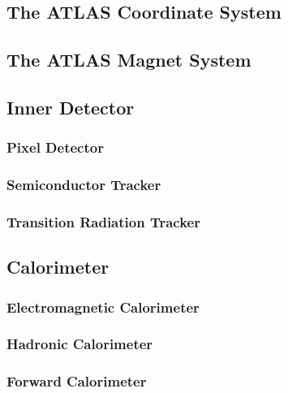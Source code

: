 \documentclass{umassthesis}          %
\begin{document}
\subsection{The ATLAS Coordinate System}\label{sec:atlas_coordinate_system}


\subsection{The ATLAS Magnet System}\label{sec:atlas_magnet}


\subsection{Inner Detector}\label{sec:atlas_id}

\subsubsection{Pixel Detector}\label{sec:atlas_pixel}

\subsubsection{Semiconductor Tracker}\label{sec:atlas_sct}

\subsubsection{Transition Radiation Tracker}\label{sec:atlas_trt}


\subsection{Calorimeter}\label{sec:atlas_calorimeter}

\subsubsection{Electromagnetic Calorimeter}\label{sec:atlas_em_calorimeter}

\subsubsection{Hadronic Calorimeter}\label{sec:atlas_had_calorimeter}
 
\subsubsection{Forward Calorimeter}\label{sec:atlas_fcal}

\end{document}
